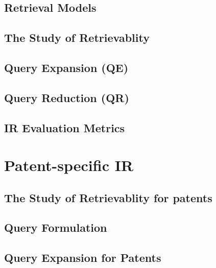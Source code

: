 \subsection{Retrieval Models}
\label{subsub:retmodels}


\subsection{The Study of Retrievablity}

\label{subsub:retrievability}

\subsection{Query Expansion (QE)}


\subsection{Query Reduction (QR)}

%

\subsection{IR Evaluation Metrics}



\section{Patent-specific IR}
\label{subsec:patentir}

\subsection{The Study of Retrievablity for patents}


\subsection{Query Formulation}


\subsection{Query Expansion for Patents}


